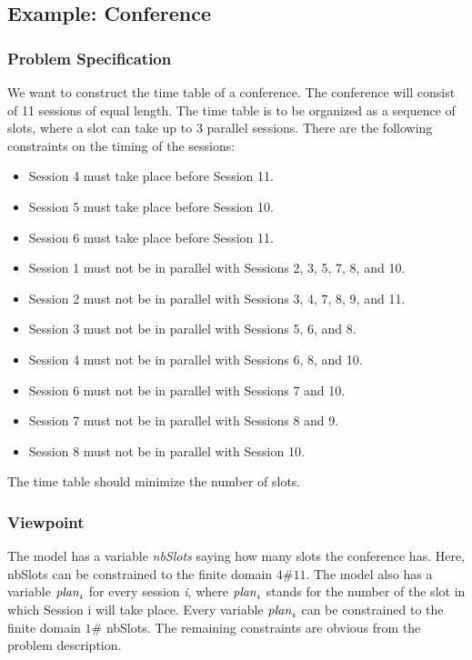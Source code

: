 \documentclass[a4paper]{scrartcl}
\begin{document}
\newpage
\subsection{Example: Conference}
\subsubsection{Problem Specification}
We want to construct the time table of a conference. 
The conference will consist of 11 sessions of equal length. 
The time table is to be organized as a sequence of slots, 
where a slot can take up to 3 parallel sessions. There are 
the following constraints on the timing of the sessions: 
\begin{itemize}
\item
Session 4 must take place before Session 11.
\item
Session 5 must take place before Session 10.
\item
Session 6 must take place before Session 11.
\item
Session 1 must not be in parallel with Sessions 2, 3, 5, 7, 8, and 10. 
\item
Session 2 must not be in parallel with Sessions 3, 4, 7, 8, 9, and 11. 
\item
Session 3 must not be in parallel with Sessions 5, 6, and 8. 
\item
Session 4 must not be in parallel with Sessions 6, 8, and 10. 
\item
Session 6 must not be in parallel with Sessions 7 and 10. 
\item
Session 7 must not be in parallel with Sessions 8 and 9. 
\item
Session 8 must not be in parallel with Session 10. 
\end{itemize}
The time table should minimize the number of slots.  

\subsubsection{Viewpoint}
The model has a variable {\it nbSlots} saying how many slots 
the conference has. Here, nbSlots can be constrained to the finite 
domain $ 4\#11 $. The model also has a variable ${\it plan}_i $ for 
every session {\it i}, where ${\it plan}_i $ stands 
for the number of the slot in which Session i will take place. 
Every variable ${\it plan}_i $ can be constrained to the finite 
domain $ 1 \# $ nbSlots. The remaining constraints are obvious from 
the problem description. 
\end{document}
